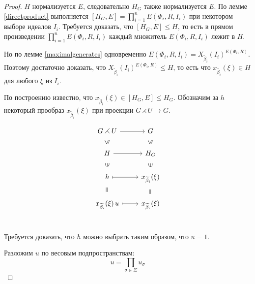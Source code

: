 \documentclass[12pt]{matmex-diploma}
\theoremstyle{mystyleni}
\theoremstyle{mystyle}
\newcommand\refb[1]{\ref{#1}}
\renewcommand{\le}{\leqslant}
\begin{document}
\begin{proof} \quad
$H$ нормализуется $E$, следовательно $H_G$ также нормализуется $E$.
\linebreak
По лемме \refb{directproduct} выполняется $[H_G,E] = \prod_{i=1}^n E(\Phi_i,R,I_i)$ при некотором выборе идеалов $I_i$. Требуется доказать, что $[H_G,E] \le H$, то есть в прямом произведении $\prod_{i=1}^n E(\Phi_i,R,I_i)$ каждый множитель $E(\Phi_i,R,I_i)$  лежит в $H$.

Но по лемме \refb{maximalgenerates} одновременно \vspace{0.8ex} $E(\Phi_i,R,I_i) = X_{\widetilde\beta_i}(I_i)^{E(\Phi_i,R)}$.
Поэтому достаточно доказать, что $X_{\widetilde\beta_i}(I_i)^{E(\Phi_i,R)} \le H$, то есть что
$x_{\widetilde{\beta_i}}(\xi) \in H$ для любого $\xi$ из $I_i$.\vspace{0.8ex}

По построению известно, что $x_{\widetilde\beta_i}(\xi) \in [H_G,E] \le H_G$.
Обозначим за $h$ некоторый прообраз $x_{\widetilde\beta_i}(\xi)$ при проекции $G \rightthreetimes U \rightarrow G$.

\begin{equation*}
\tikzset{
  Subgroup/.style={
    draw=none,
    every to/.append style={
      edge node={node [sloped, allow upside down, auto=false]{$\le$}}}},
  Equals/.style={
    draw=none,
    every to/.append style={
      edge node={node [sloped, allow upside down, auto=false]{$=$}}}},
  Included/.style={
    draw=none,
    every to/.append style={
      edge node={node [sloped, allow upside down, auto=false]{$\in$}}}}
}
\begin{tikzcd}
G \rightthreetimes U \arrow{r}{} & G \\
H \arrow[Subgroup]{u} \arrow{r}{} & H_G \arrow[Subgroup]{u} \\
h \arrow[Included]{u} \arrow[maps to]{r}{} & x_{\widetilde\beta_i}(\xi) \arrow[Included]{u} \\
x_{\widetilde\beta_i}(\xi)\,u \arrow[Equals]{u} \arrow[maps to]{r}{} & x_{\widetilde\beta_i}(\xi) \arrow[Equals]{u} \\
\end{tikzcd}
\end{equation*}


Требуется доказать, что $h$ можно выбрать таким образом, что $u=1$.


Разложим $u$ по весовым подпространствам:
\begin{equation}\label{weightdecompmain}
u = \prod_{\sigma \in \Sigma} u_\sigma
\end{equation}


\end{proof}
\end{document}
